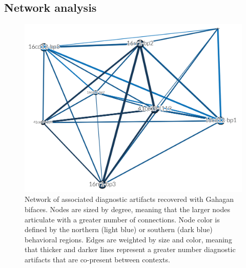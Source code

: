 \documentclass[]{interact}
\theoremstyle{plain}%
\theoremstyle{definition}
\theoremstyle{remark}
\begin{document}
\hypertarget{network-analysis}{%
\subsection{Network analysis}\label{network-analysis}}

\begin{figure}

{\centering \includegraphics[width=0.8\linewidth]{img/fig04} 

}

\caption{Network of associated diagnostic artifacts recovered with Gahagan bifaces. Nodes are sized by degree, meaning that the larger nodes articulate with a greater number of connections. Node color is defined by the northern (light blue) or southern (dark blue) behavioral regions. Edges are weighted by size and color, meaning that thicker and darker lines represent a greater number diagnostic artifacts that are co-present between contexts.}\label{fig:associated.net}
\end{figure}
\end{document}
